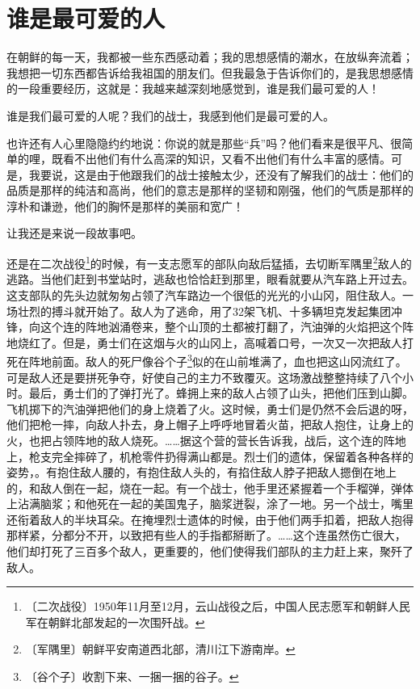 \documentclass[12pt,UTF-8,openany]{ctexbook}
\begin{document}
\chapter{谁是最可爱的人}

\begin{large}
    
    在朝鲜的每一天，我都被一些东西感动着；我的思想感情的潮水，在放纵奔流着；我想把一切东西都告诉给我祖国的朋友们。但我最急于告诉你们的，是我思想感情的一段重要经历，这就是：我越来越深刻地感觉到，谁是我们最可爱的人！
    
    谁是我们最可爱的人呢？我们的战士，我感到他们是最可爱的人。
    
    也许还有人心里隐隐约约地说：你说的就是那些“兵”吗？他们看来是很平凡、很简单的哩，既看不出他们有什么高深的知识，又看不出他们有什么丰富的感情。可是，我要说，这是由于他跟我们的战士接触太少，还没有了解我们的战士：他们的品质是那样的纯洁和高尚，他们的意志是那样的坚韧和刚强，他们的气质是那样的淳朴和谦逊，他们的胸怀是那样的美丽和宽广！
    
    让我还是来说一段故事吧。
    
    还是在二次战役\footnote{〔二次战役〕1950年11月至12月，云山战役之后，中国人民志愿军和朝鲜人民军在朝鲜北部发起的一次围歼战。}的时候，有一支志愿军的部队向敌后猛插，去切断军隅里\footnote{〔军隅里〕朝鲜平安南道西北部，清川江下游南岸。}敌人的逃路。当他们赶到书堂站时，逃敌也恰恰赶到那里，眼看就要从汽车路上开过去。这支部队的先头边就匆匆占领了汽车路边一个很低的光光的小山冈，阻住敌人。一场壮烈的搏斗就开始了。敌人为了逃命，用了32架飞机、十多辆坦克发起集团冲锋，向这个连的阵地汹涌卷来，整个山顶的土都被打翻了，汽油弹的火焰把这个阵地烧红了。但是，勇士们在这烟与火的山冈上，高喊着口号，一次又一次把敌人打死在阵地前面。敌人的死尸像谷个子\footnote{〔谷个子〕收割下来、一捆一捆的谷子。}似的在山前堆满了，血也把这山冈流红了。可是敌人还是要拼死争夺，好使自己的主力不致覆灭。这场激战整整持续了八个小时。最后，勇士们的了弹打光了。蜂拥上来的敌人占领了山头，把他们压到山脚。飞机掷下的汽油弹把他们的身上烧着了火。这时候，勇士们是仍然不会后退的呀，他们把枪一摔，向敌人扑去，身上帽子上呼呼地冒着火苗，把敌人抱住，让身上的火，也把占领阵地的敌人烧死。……据这个营的营长告诉我，战后，这个连的阵地上，枪支完全摔碎了，机枪零件扔得满山都是。烈士们的遗体，保留着各种各样的姿势，。有抱住敌人腰的，有抱住敌人头的，有掐住敌人脖子把敌人摁倒在地上的，和敌人倒在一起，烧在一起。有一个战士，他手里还紧握着一个手榴弹，弹体上沾满脑浆；和他死在一起的美国鬼子，脑浆迸裂，涂了一地。另一个战士，嘴里还衔着敌人的半块耳朵。在掩埋烈士遗体的时候，由于他们两手扣着，把敌人抱得那样紧，分都分不开，以致把有些人的手指都掰断了。……这个连虽然伤亡很大，他们却打死了三百多个敌人，更重要的，他们使得我们部队的主力赶上来，聚歼了敌人。
    

\end{large}
\end{document}
